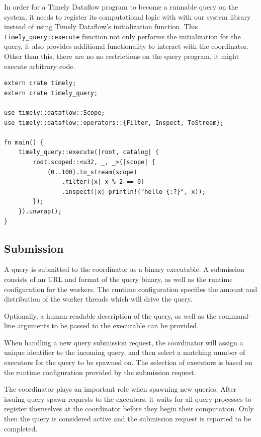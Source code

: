 In order for a Timely Dataflow program to become a runnable query on the system,
it needs to register its computational logic with with our system library instead of
using Timely Dataflow's initialization function. This
\lstinline{timely_query::execute} function not only performs the initialization
for the query, it also provides additional functionality to interact with the
coordinator. Other than this, there are no no restrictions on the query program,
it might execute arbitrary code.

\begin{lstlisting}[caption={[Example query.]Example query which creates a stream of integers,
filters out all odd numbers and then prints the rest.}]
extern crate timely;
extern crate timely_query;

use timely::dataflow::Scope;
use timely::dataflow::operators::{Filter, Inspect, ToStream};

fn main() {
    timely_query::execute(|root, catalog| {
        root.scoped::<u32, _, _>(|scope| {
            (0..100).to_stream(scope)
                .filter(|x| x % 2 == 0)
                .inspect(|x| println!("hello {:?}", x));
        });
    }).unwrap();
}
\end{lstlisting}

\subsection{Submission}

A query is submitted to the coordinator as a binary executable. A submission
consists of an URL and format of the query binary, as well as the runtime
configuration for the workers. The runtime configuration specifies the amount
and distribution of the worker threads which will drive the query.

Optionally, a human-readable description of the query,
as well as the command-line arguments to be passed to the executable can be
provided. 

When handling a new query submission request, the coordinator will assign a
unique identifier to the incoming query, and then select a
matching number of executors for the query to be spawned on. The selection
of executors is based on the runtime configuration provided by the submission
request.

The coordinator plays an important role when spawning new queries. After
issuing query spawn requests to the executors, it waits for all query processes
to register themselves at the coordinator before they begin their computation.
Only then the query is considered active and the submission request
is reported to be completed.

